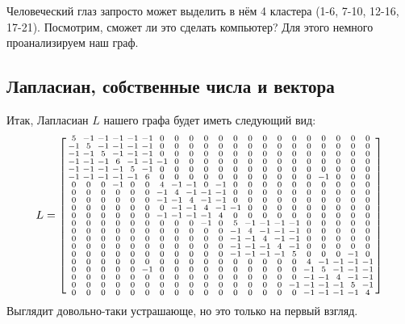 \documentclass[a4paper,hidelinks,14pt]{extarticle}
\begin{document}
	Человеческий глаз запросто может выделить в нём 4 кластера (1-6, 7-10, 12-16, 17-21). Посмотрим, сможет ли это сделать компьютер? Для этого немного проанализируем наш граф.
	
	\subsection{Лапласиан, собственные числа и вектора}
	Итак, Лапласиан $L$ нашего графа будет иметь следующий вид:
	$$
	L = \begin{bsmallmatrix}
		5	&-1	&-1	&-1 &-1 &-1 &0	&0	&0	&0	&0	&0	&0	&0	&0	&0	&0	&0	&0	&0	&0\\
		-1&	5	&-1	&-1	&-1	&-1	&0	&0	&0	&0	&0	&0	&0	&0	&0	&0	&0	&0	&0	&0	&0\\
		-1&	-1	&5	&-1	&-1	&-1	&0	&0	&0	&0	&0	&0	&0	&0	&0	&0	&0	&0	&0	&0	&0\\
		-1&	-1	&-1	&6	&-1	&-1	&-1	&0	&0	&0	&0	&0	&0	&0	&0	&0	&0	&0	&0	&0	&0\\
		-1&	-1	&-1	&-1	&5	&-1	&0	&0	&0	&0	&0	&0	&0	&0	&0	&0	&0	&0	&0	&0	&0\\
		-1&	-1	&-1	&-1	&-1	&6	&0	&0	&0	&0	&0	&0	&0	&0	&0	&0	&0	&-1	&0	&0	&0\\
		0	&0	&0	&-1	&0	&0	&4	&-1	&-1	&0	&-1	&0	&0	&0	&0	&0	&0	&0	&0	&0	&0\\
		0	&0	&0	&0	&0	&0	&-1	&4	&-1	&-1	&-1	&0	&0	&0	&0	&0	&0	&0	&0	&0	&0\\
		0	&0	&0	&0	&0	&0	&-1	&-1	&4	&-1	&-1	&0	&0	&0	&0	&0	&0	&0	&0	&0	&0\\
		0	&0	&0	&0	&0	&0	&0	&-1	&-1	&4	&-1	&-1	&0	&0	&0	&0	&0	&0	&0	&0	&0\\
		0	&0	&0	&0	&0	&0	&-1	&-1	&-1	&-1	&4	&0	&0	&0	&0	&0	&0	&0	&0	&0	&0\\
		0	&0	&0	&0	&0	&0	&0	&0	&0	&-1	&0	&5	&-1	&-1	&-1	&-1	&0	&0	&0	&0	&0\\
		0	&0	&0	&0	&0	&0	&0	&0	&0	&0	&0	&-1	&4	&-1	&-1	&-1	&0	&0	&0	&0	&0\\
		0	&0	&0	&0	&0	&0	&0	&0	&0	&0	&0	&-1	&-1	&4	&-1	&-1	&0	&0	&0	&0	&0\\
		0	&0	&0	&0	&0	&0	&0	&0	&0	&0	&0	&-1	&-1	&-1	&4	&-1	&0	&0	&0	&0	&0\\
		0	&0	&0	&0	&0	&0	&0	&0	&0	&0	&0	&-1	&-1	&-1	&-1	&5	&0	&0	&0	&-1	&0\\
		0	&0	&0	&0	&0	&0	&0	&0	&0	&0	&0	&0	&0	&0	&0	&0	&4	&-1	&-1	&-1	&-1\\
		0	&0	&0	&0	&0	&-1	&0	&0	&0	&0	&0	&0	&0	&0	&0	&0	&-1	&5	&-1	&-1	&-1\\
		0	&0	&0	&0	&0	&0	&0	&0	&0	&0	&0	&0	&0	&0	&0	&0	&-1	&-1	&4	&-1	&-1\\
		0	&0	&0	&0	&0	&0	&0	&0	&0	&0	&0	&0	&0	&0	&0	&-1	&-1	&-1	&-1	&5	&-1\\
		0	&0	&0	&0	&0	&0	&0	&0	&0	&0	&0	&0	&0	&0	&0	&0	&-1	&-1	&-1	&-1	&4\\
	\end{bsmallmatrix}
	$$
	Выглядит довольно-таки устрашающе, но это только на первый взгляд.
	
\end{document}
